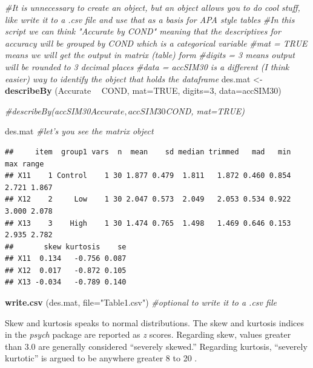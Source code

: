 \documentclass[
  english,
]{book}
\newenvironment{Shaded}{\begin{snugshade}}{\end{snugshade}}
\newcommand{\CommentTok}[1]{\textcolor[rgb]{0.56,0.35,0.01}{\textit{#1}}}
\newcommand{\DataTypeTok}[1]{\textcolor[rgb]{0.13,0.29,0.53}{#1}}
\newcommand{\DecValTok}[1]{\textcolor[rgb]{0.00,0.00,0.81}{#1}}
\newcommand{\KeywordTok}[1]{\textcolor[rgb]{0.13,0.29,0.53}{\textbf{#1}}}
\newcommand{\NormalTok}[1]{#1}
\newcommand{\OperatorTok}[1]{\textcolor[rgb]{0.81,0.36,0.00}{\textbf{#1}}}
\newcommand{\OtherTok}[1]{\textcolor[rgb]{0.56,0.35,0.01}{#1}}
\newcommand{\StringTok}[1]{\textcolor[rgb]{0.31,0.60,0.02}{#1}}
\begin{document}
\begin{Shaded}
\begin{Highlighting}[]
\CommentTok{#It is unnecessary to create an object, but an object allows you to do cool stuff, like write it to a .csv file and use that as a basis for APA style tables}
\CommentTok{#In this script we can think "Accurate by COND" meaning that the descriptives for accuracy will be grouped by COND which is a categorical variable}
\CommentTok{#mat = TRUE means we will get the output in matrix (table) form}
\CommentTok{#digits = 3 means output will be rounded to 3 decimal places}
\CommentTok{#data = accSIM30 is a different (I think easier) way to identify the object that holds the dataframe}
\NormalTok{des.mat <-}\StringTok{ }\KeywordTok{describeBy}\NormalTok{ (Accurate }\OperatorTok{~}\StringTok{ }\NormalTok{COND, }\DataTypeTok{mat=}\OtherTok{TRUE}\NormalTok{, }\DataTypeTok{digits=}\DecValTok{3}\NormalTok{, }\DataTypeTok{data=}\NormalTok{accSIM30) }

\CommentTok{#describeBy(accSIM30$Accurate, accSIM30$COND, mat=TRUE)}

\NormalTok{des.mat }\CommentTok{#let's you see the matrix object}
\end{Highlighting}
\end{Shaded}

\begin{verbatim}
##     item  group1 vars  n  mean    sd median trimmed   mad   min   max range
## X11    1 Control    1 30 1.877 0.479  1.811   1.872 0.460 0.854 2.721 1.867
## X12    2     Low    1 30 2.047 0.573  2.049   2.053 0.534 0.922 3.000 2.078
## X13    3    High    1 30 1.474 0.765  1.498   1.469 0.646 0.153 2.935 2.782
##       skew kurtosis    se
## X11  0.134   -0.756 0.087
## X12  0.017   -0.872 0.105
## X13 -0.034   -0.789 0.140
\end{verbatim}

\begin{Shaded}
\begin{Highlighting}[]
\KeywordTok{write.csv}\NormalTok{ (des.mat, }\DataTypeTok{file=}\StringTok{"Table1.csv"}\NormalTok{) }\CommentTok{#optional to write it to a .csv file}
\end{Highlighting}
\end{Shaded}

Skew and kurtosis speaks to normal distributions. The skew and kurtosis indices in the \emph{psych} package are reported as \emph{z} scores. Regarding skew, values greater than 3.0 are generally considered ``severely skewed.'' Regarding kurtosis, ``severely kurtotic'' is argued to be anywhere greater 8 to 20 \citep{kline_principles_2016}.
\end{document}
